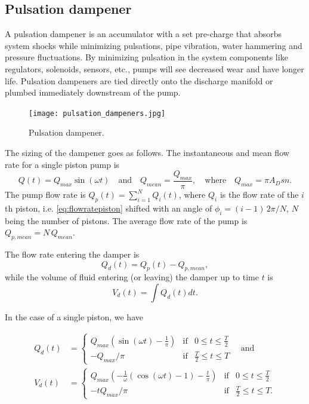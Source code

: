 \clearpage

\subsection{Pulsation dampener}

A pulsation dampener is an accumulator with a set pre-charge that absorbs system shocks while minimizing pulsations, pipe vibration, water hammering and pressure fluctuations. By minimizing pulsation in the system components like regulators, solenoids, sensors, etc., pumps will see decreased wear and have longer life. Pulsation dampeners are tied directly onto the discharge manifold or plumbed immediately downstream of the pump.

\begin{figure}[h]
\begin{center}
\texttt{[image: pulsation\_dampeners.jpg]}
\caption{\label{fig:pulsation_dampener}Pulsation dampener.}
\end{center}
\end{figure}

The sizing of the dampener goes as follows. The instantaneous and mean flow rate for a single piston pump is 
%
\begin{equation}
Q(t)=Q_{max} \sin (\omega t) \quad \text{and} \quad Q_{mean}=\frac{Q_{max}}{\pi}, \quad \text{where} \quad Q_{max}=\pi A_D s n.
\label{eq:flowratepiston}
\end{equation}
%
The pump flow rate is $Q_p(t)=\sum_{i=1}^N Q_i(t)$, where $Q_i$ is the flow rate of the $i$th piston, i.e. \eqref{eq:flowratepiston} shifted with an angle of $\phi_i=(i-1)\,2\pi/N$, $N$ being the number of pistons. The average flow rate of the pump is $Q_{p,mean}=N\,Q_{mean}$.

The flow rate entering the damper is
%
\begin{equation}
Q_d(t)=Q_p(t)-Q_{p,mean},
\end{equation}
%
while the volume of fluid entering (or leaving) the damper up to time $t$ is
%
\begin{equation}
V_d(t)=\int Q_d(t) dt.
\end{equation}

In the case of a single piston, we have

\begin{align}
Q_d(t)&=\left\{
\begin{matrix}
Q_{max} \left( \sin (\omega t) -\frac{1}{\pi} \right) & \text{if} & 0\leq t \leq \frac{T}{2}\\
-Q_{max}/\pi  & \text{if} & \frac{T}{2}\leq t \leq T
\end{matrix}
\right.
%
\quad 
\text{and}\\
%
V_d(t)&=\left\{
\begin{matrix}
Q_{max} \left( -\frac{1}{\omega}\left(\cos (\omega t)-1\right) -\frac{t}{\pi}\right)  & \text{if} & 0\leq t \leq \frac{T}{2}\\
-t Q_{max} /\pi & \text{if} & \frac{T}{2}\leq t \leq T.
\end{matrix}
\right.
\end{align}

